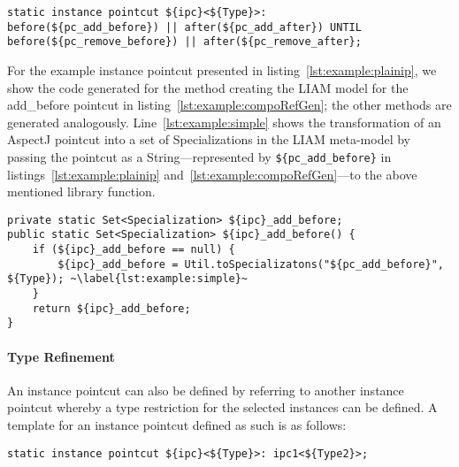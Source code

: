 \begin{lstlisting}[caption={Example of a plain instance pointcut}, label=lst:example:plainip,moreemph=instance]
static instance pointcut ${ipc}<${Type}>:
before(${pc_add_before}) || after(${pc_add_after}) UNTIL 
before(${pc_remove_before}) || after(${pc_remove_after};
\end{lstlisting}

For the example instance pointcut presented in listing~\ref{lst:example:plainip}, we show the code generated for the method creating the LIAM model for the add_before pointcut in listing~\ref{lst:example:compoRefGen}; the other methods are generated analogously.
Line~\ref{lst:example:simple} shows the transformation of an AspectJ pointcut into a set of Specializations in the LIAM meta-model by passing the pointcut as a String---represented by \lstinline!${pc_add_before}! in listings~\ref{lst:example:plainip} and~\ref{lst:example:compoRefGen}---to the above mentioned library function.

\begin{lstlisting}[caption={Template for creating the LIAM model for the add_before expression},label={lst:example:compoRefGen}]
private static Set<Specialization> ${ipc}_add_before;
public static Set<Specialization> ${ipc}_add_before() {
	if (${ipc}_add_before == null) {
		${ipc}_add_before = Util.toSpecializatons("${pc_add_before}", ${Type}); ~\label{lst:example:simple}~
	}
	return ${ipc}_add_before;
}
\end{lstlisting}

\paragraph{Type Refinement}
An instance pointcut can also be defined by referring to another instance pointcut whereby a type restriction for the selected instances can be defined.
A template for an instance pointcut defined as such is as follows:

\begin{lstlisting}[numbers=none, emph={instance}]
static instance pointcut ${ipc}<${Type}>: ipc1<${Type2}>;
\end{lstlisting}

